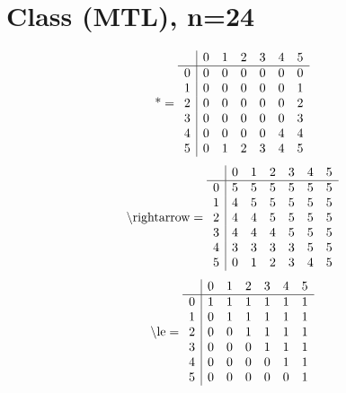 \documentclass[11pt]{article}
\begin{document}
\section{Class (MTL), n=24}
\[\text{*} = 
\begin{array}{r | r r r r r r}
 & 0 & 1 & 2 & 3 & 4 & 5 \\ \hline
0 & 0 & 0 & 0 & 0 & 0 & 0 \\
1 & 0 & 0 & 0 & 0 & 0 & 1 \\
2 & 0 & 0 & 0 & 0 & 0 & 2 \\
3 & 0 & 0 & 0 & 0 & 0 & 3 \\
4 & 0 & 0 & 0 & 0 & 4 & 4 \\
5 & 0 & 1 & 2 & 3 & 4 & 5 \\
\end{array}
\]
\[\text{\textbackslash rightarrow} = 
\begin{array}{r | r r r r r r}
 & 0 & 1 & 2 & 3 & 4 & 5 \\ \hline
0 & 5 & 5 & 5 & 5 & 5 & 5 \\
1 & 4 & 5 & 5 & 5 & 5 & 5 \\
2 & 4 & 4 & 5 & 5 & 5 & 5 \\
3 & 4 & 4 & 4 & 5 & 5 & 5 \\
4 & 3 & 3 & 3 & 3 & 5 & 5 \\
5 & 0 & 1 & 2 & 3 & 4 & 5 \\
\end{array}
\]
\[\text{\textbackslash le} = 
\begin{array}{r | r r r r r r}
 & 0 & 1 & 2 & 3 & 4 & 5 \\ \hline
0 & 1 & 1 & 1 & 1 & 1 & 1 \\
1 & 0 & 1 & 1 & 1 & 1 & 1 \\
2 & 0 & 0 & 1 & 1 & 1 & 1 \\
3 & 0 & 0 & 0 & 1 & 1 & 1 \\
4 & 0 & 0 & 0 & 0 & 1 & 1 \\
5 & 0 & 0 & 0 & 0 & 0 & 1 \\
\end{array}
\]
\end{document}
